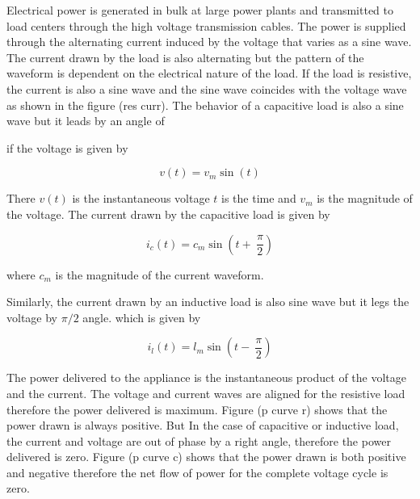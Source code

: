 Electrical power is generated in bulk at large power plants and transmitted to load centers through the high voltage transmission cables. 
The power is supplied through the alternating current induced by the voltage that varies as a sine wave. The current drawn by the load is also alternating but the pattern of the waveform is dependent on the electrical nature of the load. If the load is resistive, the current is also a sine wave and the sine wave coincides with the voltage wave as shown in the figure (res curr). The behavior of a capacitive load is also a sine wave but it leads by an angle of 


if the voltage is given by 

$$v(t) = v_{m}\sin\left(t\right)$$

There $v(t)$ is the instantaneous voltage $t$ is the time and $v_{m}$ is the magnitude of the voltage.
The current drawn by the capacitive load is given by 

$$i_c(t) = c_{m}\sin\left(t+\ \frac{\pi}{2}\right)$$

where $c_{m}$ is the magnitude of the current waveform.

Similarly, the current drawn by an inductive load is also sine wave but it legs the voltage by $\pi/2$ angle. which is given by 

$$i_l(t) = l_{m}\sin\left(t-\ \frac{\pi}{2}\right)$$
 
The power delivered to the appliance is the instantaneous product of the voltage and the current. The voltage and current waves are aligned for the resistive load therefore the power delivered is maximum. Figure (p curve r) shows that the power drawn is always positive. But In the case of capacitive or inductive load, the current and voltage are out of phase by a right angle, therefore the power delivered is zero. 
Figure (p curve c) shows that the power drawn is both positive and negative therefore the net flow of power for the complete voltage cycle is zero.

